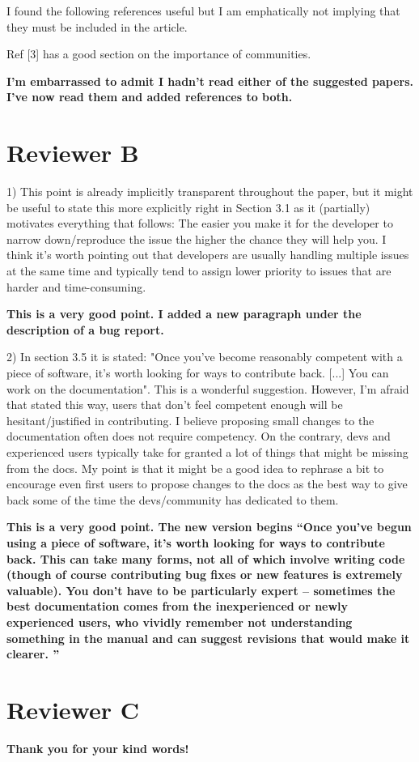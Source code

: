 \documentclass[11pt]{article}
\newcommand{\response}[1]{\textcolor{Mahogany}{\textbf{#1}}}
\begin{document}
I found the following references useful but I am emphatically not
implying that they must be included in the article.

Ref [3] has a good section on the importance of communities.

\response{I'm embarrassed to admit I hadn't read either of the suggested papers.
I've now read them and added references to both.}


\section{Reviewer B}

1) This point is already implicitly transparent throughout the paper, but it
might be useful to state this more explicitly right in Section 3.1 as it
(partially) motivates everything that follows: The easier you make it for the
developer to narrow down/reproduce the issue the higher the chance they will
help you. I think it's worth pointing out that developers are usually handling
multiple issues at the same time and typically tend to assign lower priority to
issues that are harder and time-consuming.

\response{This is a very good point. I added a new paragraph under the description of a bug report.}

2) In section 3.5 it is stated: "Once you’ve become reasonably competent with a
piece of software, it’s worth looking for ways to contribute back. [...] You can
work on the documentation". This is a wonderful suggestion. However, I'm afraid
that stated this way, users that don't feel competent enough will be
hesitant/justified in contributing. I believe proposing small changes to the
documentation often does not require competency. On the contrary, devs and
experienced users typically take for granted a lot of things that might be
missing from the docs. My point is that it might be a good idea to rephrase a
bit to encourage even first users to propose changes to the docs as the best way
to give back some of the time the devs/community has dedicated to them.

\response{This is a very good point. The new version begins ``Once you've begun using a piece of software, it's worth looking for ways to
contribute back.  This can take many forms, not all of which involve writing
code (though of course contributing bug fixes or new features is extremely
valuable). You don't have to be particularly expert -- sometimes the best
documentation comes from the inexperienced or newly experienced users, who
vividly remember not understanding something in the manual and can suggest
revisions that would make it clearer. ''}

\section{Reviewer C}

\response{Thank you for your kind words!}
\end{document}
